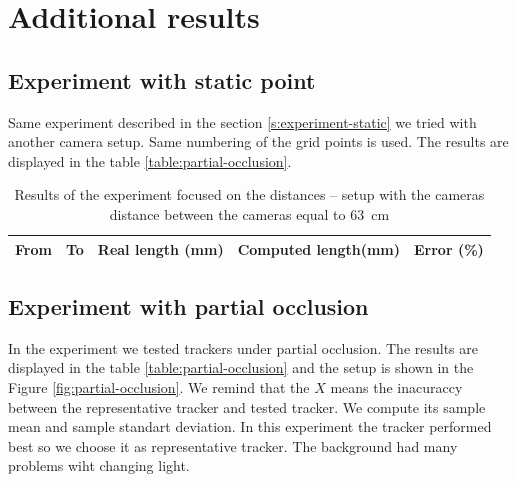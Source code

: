 \chapter{Additional results}

\section{Experiment with static point}

Same experiment described in the section \ref{s:experiment-static} we tried
with another camera setup. Same numbering of the grid points is used. The
results are displayed in the table \ref{table:partial-occlusion}.

\begin{table}[h!]
\centering
\begin{tabular}{|r|r|r|r|r|}
\hline
From    & To    & Real length (mm) & Computed length(mm) & Error (\%) \\
\hline
\hline

\hline
\end{tabular}
\caption{Results of the experiment focused on the distances -- setup with the cameras distance between the cameras equal to 63~cm}
\label{table:distances-second}
\end{table}

\section{Experiment with partial occlusion}

In the experiment we tested trackers under partial occlusion. The results are
displayed in the table \ref{table:partial-occlusion} and the setup is shown in
the Figure \ref{fig:partial-occlusion}. We remind that the $X$ means the
inacuraccy between the representative tracker and tested tracker. We compute
its sample mean and sample standart deviation. In this experiment the \hsv{}
tracker performed best so we choose it as representative tracker. The
\simback{} background had many problems wiht changing light.

